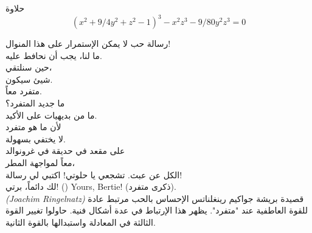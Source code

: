 \begin{surferPage}{حلاوة}
\[(x^2+ 9/4y^2	+ z^2- 1)^3- x^2z^3	- 9/80y^2z^3	= 0\]

\singlespacing
رسالة حب
\singlespacing
لا يمكن الإستمرار على هذا المنوال!\\
ما لنا، يجب أن نحافط عليه.\\
حين سنلتقي،\\
شيئ سيكون.\\
متفرد معاً. \\
ما جديد المتفرد؟\\
ما من بديهيات على الأكيد.\\
لأن ما هو متفرد\\
لا يختفي بسهولة.\\
على مقعد في حديقة في غرونوالد\\
معاً لمواجهة المطر،\\
الكل عن عبث. تشجعي يا حلوتي! اكتبي لي رسالة!\\
لك دائماً، برتي! ()
\textenglish{Yours, Bertie!} (ذكرى متفرد).\\
\textenglish{\textit{(Joachim Ringelnatz)}} قصيدة بريشة جواكيم رينغلناتس
\singlespacing 
الإحساس بالحب مرتبط عادة للقوة العاطفية عند "متفرد". يظهر هذا الإرتباط في عدة أشكال فنية.
\singlespacing 
حاولوا تغيير القوة الثالثة في المعادلة واستبدالها بالقوة الثانية.
\end{surferPage}
